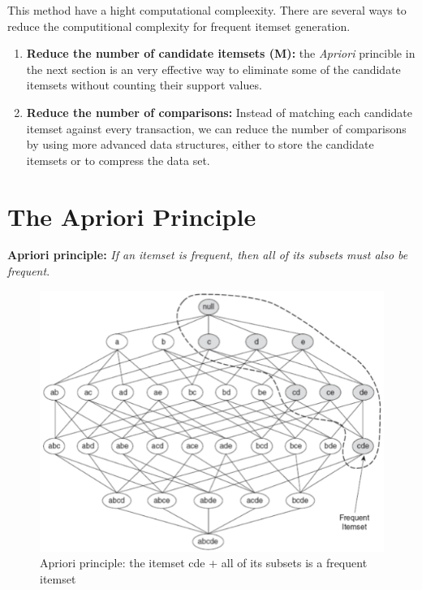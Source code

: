 		This method have a hight computational compleexity. There are several ways to reduce 
		the computitional complexity for frequent itemset generation. 

		\begin{enumerate}
			\item {\bf Reduce the number of candidate itemsets (M):} the {\it Apriori}
			princible in the next section is an very effective way to eliminate
			some of the candidate itemsets without counting their support values. 
			\item{\bf Reduce the number of comparisons:} Instead of matching each candidate
			itemset against every transaction, we can reduce the number of 
			comparisons by using more advanced data structures, either to store the
			candidate itemsets or to compress the data set. 
		\end{enumerate}

	\clearpage
	\section{The Apriori Principle}

		{\bf Apriori principle:} {\it If an itemset is frequent, then all of its subsets must also be frequent}.

		\begin{figure}[H]
			\centering
			\includegraphics[scale=0.5]{pics/lattice3.png}
			\caption{Apriori principle: the itemset cde + all of its subsets is a frequent itemset}
		\end{figure}


